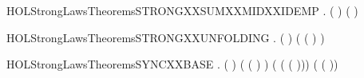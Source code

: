 \begin{SaveVerbatim}{HOLStrongLawsTheoremsSTRONGXXSUMXXMIDXXIDEMP}
\HOLTokenTurnstile{} \HOLSymConst{\HOLTokenForall{}} .  ( \HOLSymConst{\ensuremath{+}}  \HOLSymConst{\ensuremath{+}} ) ( \HOLSymConst{\ensuremath{+}} )
\end{SaveVerbatim}
\newcommand{\HOLStrongLawsTheoremsSTRONGXXSUMXXMIDXXIDEMP}{\UseVerbatim{HOLStrongLawsTheoremsSTRONGXXSUMXXMIDXXIDEMP}}
\begin{SaveVerbatim}{HOLStrongLawsTheoremsSTRONGXXUNFOLDING}
\HOLTokenTurnstile{} \HOLSymConst{\HOLTokenForall{}} .  (  ) (  (  ) )
\end{SaveVerbatim}
\newcommand{\HOLStrongLawsTheoremsSTRONGXXUNFOLDING}{\UseVerbatim{HOLStrongLawsTheoremsSTRONGXXUNFOLDING}}
\begin{SaveVerbatim}{HOLStrongLawsTheoremsSYNCXXBASE}
\HOLTokenTurnstile{} \HOLSymConst{\HOLTokenForall{}}  .
            \HOLSymConst{=}
        ( \HOLSymConst{=} \HOLConst{\ensuremath{\tau}}) \HOLSymConst{\HOLTokenDisj{}} ( ( ) \HOLSymConst{=} \HOLConst{\ensuremath{\tau}})  
           \HOLSymConst{=}  ( ( ( ))) 
         \HOLConst{\ensuremath{\tau}}( \HOLSymConst{\ensuremath{\parallel}}  ( ))
        
\end{SaveVerbatim}
\newcommand{\HOLStrongLawsTheoremsSYNCXXBASE}{\UseVerbatim{HOLStrongLawsTheoremsSYNCXXBASE}}
